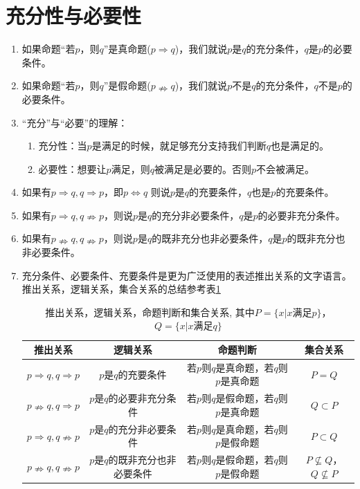 \section*{充分性与必要性}
\begin{enumerate}
    \item 如果命题“若$p$，则$q$”是真命题($p \Rightarrow q$)，我们就说$p$是$q$的充分条件，$q$是$p$的必要条件。
    \item 如果命题“若$p$，则$q$”是假命题($p \nRightarrow q$)，我们就说$p$不是$q$的充分条件，$q$不是$p$的必要条件。
    \item “充分”与“必要”的理解：
        \begin{enumerate}
            \item 充分性：当$p$是满足的时候，就足够充分支持我们判断$q$也是满足的。
            \item 必要性：想要让$p$满足，则$q$被满足是必要的。否则$p$不会被满足。
        \end{enumerate}
    \item 如果有$p \Rightarrow q, q \Rightarrow p$，即$p \Leftrightarrow q$ 则说$p$是$q$的充要条件，$q$也是$p$的充要条件。
    \item 如果有$p \Rightarrow q, q \nRightarrow p$，则说$p$是$q$的充分非必要条件，$q$是$p$的必要非充分条件。
    \item 如果有$p \nRightarrow q, q \nRightarrow p$，则说$p$是$q$的既非充分也非必要条件，$q$是$p$的既非充分也非必要条件。
    \item 充分条件、必要条件、充要条件是更为广泛使用的表述推出关系的文字语言。推出关系，逻辑关系，集合关系的总结参考表\ref{tab:Condition}
        
    
    \begin{table}[h]
        \centering
        \begin{tabular}{|c|c|c|c|}
            \hline
            推出关系 & 逻辑关系 & 命题判断 & 集合关系 \\
            \hline
            $p \Rightarrow q, q \Rightarrow p$ & $p$是$q$的充要条件 & 若$p$则$q$是真命题，若$q$则$p$是真命题 & $P = Q$\\
            \hline
            $p \nRightarrow q, q \Rightarrow p$ & $p$是$q$的必要非充分条件 & 若$p$则$q$是假命题，若$q$则$p$是真命题 & $Q \subset P$ \\
            \hline
            $p \Rightarrow q, q \nRightarrow p$ & $p$是$q$的充分非必要条件 & 若$p$则$q$是真命题，若$q$则$p$是假命题 & $P \subset Q$ \\
            \hline
            $p \nRightarrow q, q \nRightarrow p$ & $p$是$q$的既非充分也非必要条件 & 若$p$则$q$是假命题，若$q$则$p$是假命题 & $P \not\subseteq Q$，$Q \not\subseteq P$\\
            \hline
        \end{tabular}
        \caption{推出关系，逻辑关系，命题判断和集合关系, 其中$P = \{x|x\mbox{满足}p\}$，$Q = \{x|x\mbox{满足}q\}$}
        \label{tab:Condition}
    \end{table}
\end{enumerate}

